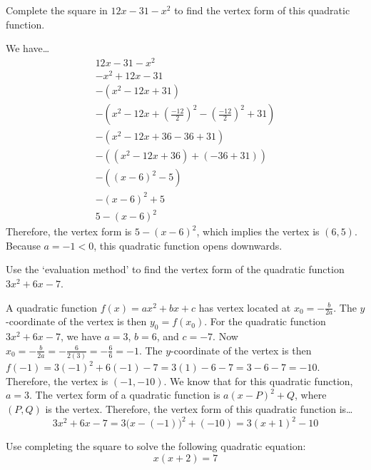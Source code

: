\documentclass[11pt,letterpaper]{article}
\begin{document}

 Complete the square in $12x - 31 - x^2$ to find the vertex form of this quadratic function. \pspace

\sol We have\dots
	\[
	\begin{gathered}
	12x - 31 - x^2 \\[0.3cm]
	-x^2 + 12x - 31 \\[0.3cm]
	-(x^2 - 12x + 31) \\[0.3cm]
	-\left(x^2 - 12x + \left( \frac{-12}{2} \right)^2 - \left( \frac{-12}{2} \right)^2 + 31 \right) \\[0.3cm]
	-\left(x^2 - 12x + 36 - 36 + 31 \right) \\[0.3cm]
	-\left( (x^2 - 12x + 36) + (-36 + 31) \right) \\[0.3cm]
	-\left( (x - 6)^2 - 5 \right) \\[0.3cm]
	-(x - 6)^2 + 5 \\[0.3cm]
	5 - (x - 6)^2 
	\end{gathered}
	\]
Therefore, the vertex form is $5 - (x - 6)^2$, which implies the vertex is $(6, 5)$. Because $a= -1 < 0$, this quadratic function opens downwards. 



\newpage



 Use the `evaluation method' to find the vertex form of the quadratic function $3x^2 + 6x - 7$. \pspace

\sol A quadratic function $f(x)= ax^2 + bx + c$ has vertex located at $x_0= -\frac{b}{2a}$. The $y$-coordinate of the vertex is then $y_0= f(x_0)$. For the quadratic function $3x^2 + 6x - 7$, we have $a= 3$, $b= 6$, and $c= -7$. Now $x_0= -\frac{b}{2a}= -\frac{6}{2(3)}= -\frac{6}{6}= -1$. The $y$-coordinate of the vertex is then $f(-1)= 3(-1)^2 + 6(-1) - 7= 3(1) - 6 - 7= 3 - 6 - 7= -10$. Therefore, the vertex is $(-1, -10)$. We know that for this quadratic function, $a= 3$. The vertex form of a quadratic function is $a(x - P)^2 + Q$, where $(P, Q)$ is the vertex. Therefore, the vertex form of this quadratic function is\dots
	\[
	3x^2 + 6x - 7= 3 \big(x - (-1) \big)^2 + (-10)= 3(x + 1)^2 - 10
	\]



\newpage



 Use completing the square to solve the following quadratic equation: 
	\[
	x(x + 2)= 7
	\] \pspace
\end{document}
